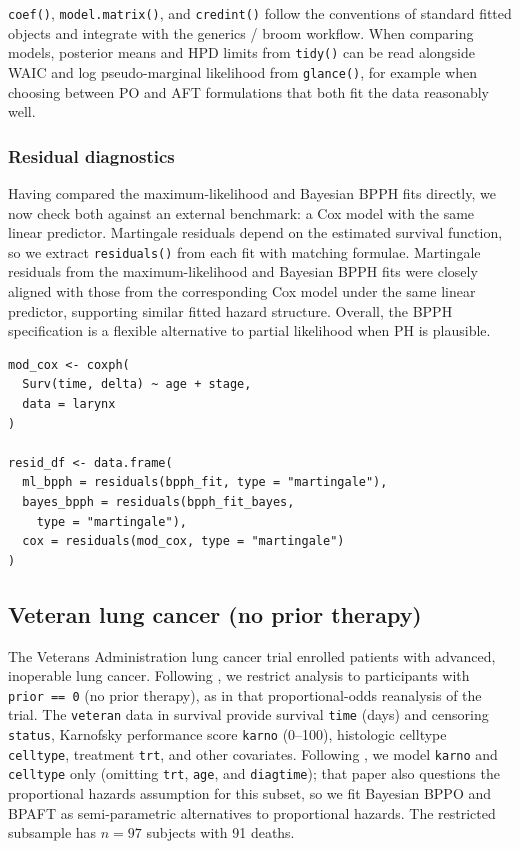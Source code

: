 \documentclass[5p,lefttitle]{elsarticle}
\providecommand{\pkg}[1]{\textsf{#1}}
\begin{document}
{\texttt{coef()},
\texttt{model.matrix()}, and \texttt{credint()} follow
the conventions of standard fitted objects and integrate with the
\pkg{generics} / broom workflow. When comparing models,
posterior means and HPD limits from \texttt{tidy()} can be read alongside
WAIC and log pseudo-marginal likelihood from \texttt{glance()}, for example when
choosing between PO and AFT formulations that both fit the data reasonably well.

\subsubsection{Residual diagnostics}\label{residual-diagnostics}

Having compared the maximum-likelihood and Bayesian BPPH fits directly,
we now check both against an external benchmark: a Cox model with the
same linear predictor. Martingale residuals depend on the estimated
survival function, so we extract \texttt{residuals()} from each fit with
matching formulae. Martingale residuals from the maximum-likelihood and Bayesian BPPH fits
were closely aligned with those from the corresponding Cox model under
the same linear predictor, supporting similar fitted hazard structure.
Overall, the BPPH specification is a flexible alternative to
partial likelihood when PH is plausible.

{\footnotesize\begin{verbatim}
mod_cox <- coxph(
  Surv(time, delta) ~ age + stage,
  data = larynx
)

resid_df <- data.frame(
  ml_bpph = residuals(bpph_fit, type = "martingale"),
  bayes_bpph = residuals(bpph_fit_bayes,
    type = "martingale"),
  cox = residuals(mod_cox, type = "martingale")
)
\end{verbatim}}

\subsection{Veteran lung cancer (no prior therapy)}\label{sec:illus-veteran}

The Veterans Administration lung cancer trial \citep{Prentice:1973,kalbfleisch2002statistical} enrolled
patients with advanced, inoperable lung cancer. Following \citet{Pettitt:1984}, we restrict
analysis to participants with \texttt{prior\ ==\ 0} (no prior therapy), as in
that proportional-odds reanalysis of the trial. The
\texttt{veteran} data in \pkg{survival} \citep{Therneau:2020} provide survival
\texttt{time} (days) and censoring \texttt{status}, Karnofsky performance score
\texttt{karno} (0--100), histologic celltype \texttt{celltype}, treatment \texttt{trt}, and other
covariates. Following \citet{Bennett:1983}, we model \texttt{karno} and \texttt{celltype}
only (omitting \texttt{trt}, \texttt{age}, and \texttt{diagtime}); that paper also questions
the proportional hazards assumption for this subset, so we fit Bayesian
BPPO and BPAFT as semi-parametric alternatives to proportional hazards.
The restricted subsample has \(n=97\) subjects with 91 deaths.

}
\end{document}
